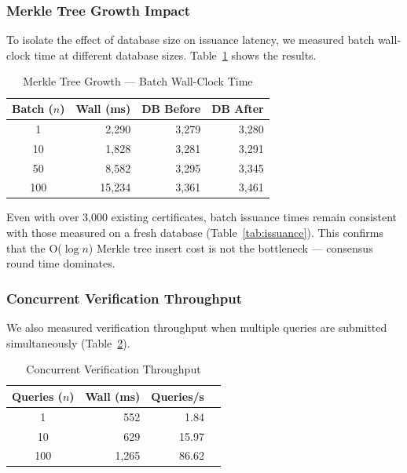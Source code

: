 \documentclass[conference]{IEEEtran}
\begin{document}
\subsubsection{Merkle Tree Growth Impact}
To isolate the effect of database size on issuance latency, we measured batch wall-clock time at different database sizes. Table~\ref{tab:merkle_growth} shows the results.

\begin{table}[t]
\caption{Merkle Tree Growth --- Batch Wall-Clock Time}
\label{tab:merkle_growth}
\centering\small\renewcommand{\arraystretch}{1.1}
\begin{tabular}{@{}crrr@{}}
\toprule
\textbf{Batch ($n$)} & \textbf{Wall (ms)} & \textbf{DB Before} & \textbf{DB After} \\
\midrule
1   & 2{,}290  & 3{,}279 & 3{,}280 \\
10  & 1{,}828  & 3{,}281 & 3{,}291 \\
50  & 8{,}582  & 3{,}295 & 3{,}345 \\
100 & 15{,}234 & 3{,}361 & 3{,}461 \\
\bottomrule
\end{tabular}
\end{table}

Even with over 3,000 existing certificates, batch issuance times remain consistent with those measured on a fresh database (Table~\ref{tab:issuance}). This confirms that the O($\log n$) Merkle tree insert cost is not the bottleneck — consensus round time dominates.

\subsubsection{Concurrent Verification Throughput}
We also measured verification throughput when multiple queries are submitted simultaneously (Table~\ref{tab:conc_verif}).

\begin{table}[t]
\caption{Concurrent Verification Throughput}
\label{tab:conc_verif}
\centering\small\renewcommand{\arraystretch}{1.1}
\begin{tabular}{@{}crrr@{}}
\toprule
\textbf{Queries ($n$)} & \textbf{Wall (ms)} & \textbf{Queries/s} \\
\midrule
1   & 552   & 1.84 \\
10  & 629   & 15.97 \\
100 & 1{,}265 & 86.62 \\
\bottomrule
\end{tabular}
\end{table}
\end{document}
